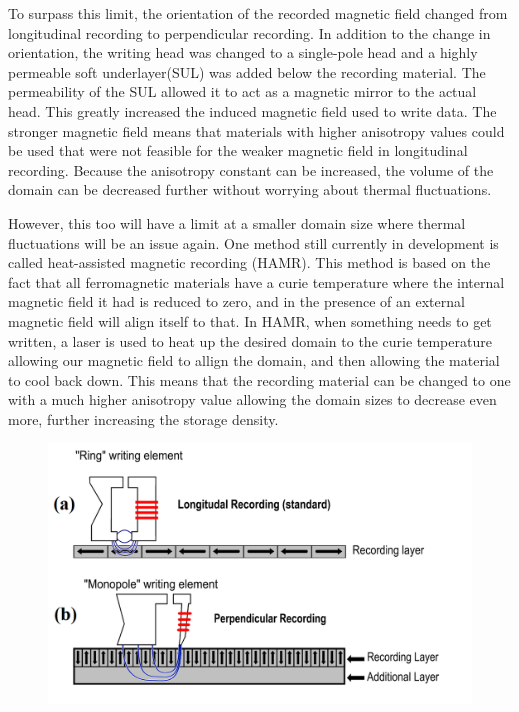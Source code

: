 \documentclass[ aip, 12pt]{revtex4-1} %
\begin{document}
To surpass this limit, the orientation of the recorded magnetic field changed from longitudinal recording to perpendicular recording. In addition to the change in orientation, the writing head was changed to a single-pole head and a highly permeable soft underlayer(SUL) was added below the recording material. The permeability of the SUL allowed it to act as a magnetic mirror to the actual head. This greatly increased the induced magnetic field used to write data. The stronger magnetic field means that materials with higher anisotropy values could be used that were not feasible for the weaker magnetic field in longitudinal recording. Because the anisotropy constant can be increased, the volume of the domain can be decreased further without worrying about thermal fluctuations.

However, this too will have a limit at a smaller domain size where thermal fluctuations will be an issue again. One method still currently in development is called heat-assisted magnetic recording (HAMR). This method is based on the fact that all ferromagnetic materials have a curie temperature where the internal magnetic field it had is reduced to zero, and in the presence of an external magnetic field will align itself to that. In HAMR, when something needs to get written, a laser is used to heat up the desired domain to the curie temperature allowing our magnetic field to allign the domain, and then allowing the material to cool back down. This means that the recording material can be changed to one with a much higher anisotropy value allowing the domain sizes to decrease even more, further increasing the storage density.

\begin{figure}[H]
\centerline{\includegraphics[scale=.45]{perpendicularComparison.png}}
\caption{ }
\label{perpendicularComparison}
\end{figure}
\end{document}
